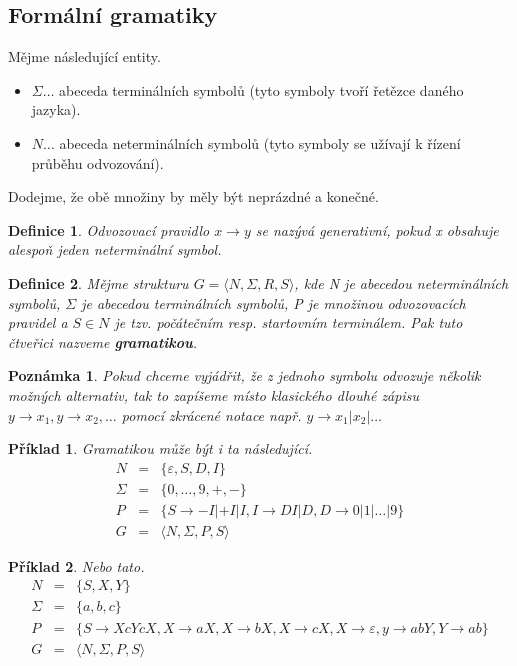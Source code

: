\documentclass[10pt, a4paper, titlepage]{article}
\theoremstyle{note}
\newtheorem{definice}{\textbf{Definice}}
\newtheorem{priklad}{\textbf{Příklad}}
\newtheorem{poznamka}{\textbf{Poznámka}}
\begin{document}
\subsection{Formální gramatiky}
Mějme následující entity.
\begin{itemize}
\item $\Sigma \ldots$ abeceda terminálních symbolů (tyto symboly tvoří řetězce daného jazyka).
\item $N \ldots$ abeceda neterminálních symbolů (tyto symboly se užívají k řízení průběhu odvozování).
\end{itemize}

Dodejme, že obě množiny by měly být neprázdné a konečné.

\begin{definice}
Odvozovací pravidlo $x \rightarrow y$ se nazývá \emph{generativní}, pokud \emph{x} obsahuje alespoň jeden neterminální symbol.
\end{definice}

\begin{definice}
Mějme strukturu $G = \langle N, \Sigma, R, S \rangle$, kde \emph{N} je abecedou neterminálních symbolů, $\Sigma$ je abecedou terminálních symbolů,
\emph{P} je množinou odvozovacích pravidel a $S \in N$ je tzv. počátečním resp. startovním terminálem. Pak tuto čtveřici nazveme \textbf{gramatikou}.
\end{definice}

\begin{poznamka}
Pokud chceme vyjádřit, že z jednoho symbolu odvozuje několik možných alternativ, tak to zapíšeme místo klasického dlouhé zápisu
$y \rightarrow x_{1}, y \rightarrow x_{2}, \ldots$ pomocí zkrácené notace např. $y \rightarrow x_{1}|x_{2}|\ldots$
\end{poznamka}

\begin{priklad}
Gramatikou může být i ta následující.
\begin{eqnarray*}
N &=& \lbrace \varepsilon, S, D, I \rbrace \\
\Sigma &=& \lbrace 0, \ldots, 9, +, - \rbrace \\
P &=& \lbrace S \rightarrow -I|+I|I, I \rightarrow DI|D, D \rightarrow 0|1|\ldots |9 \rbrace \\
G &=& \langle N, \Sigma, P, S \rangle
\end{eqnarray*}
\end{priklad}

\begin{priklad}
Nebo tato.
\begin{eqnarray*}\label{priklad-2}
N &=& \lbrace S, X, Y \rbrace \\
\Sigma &=& \lbrace a, b, c \rbrace \\
P &=& \lbrace S \rightarrow XcYcX, X \rightarrow aX, X \rightarrow bX, X \rightarrow cX, X \rightarrow \varepsilon,
y \rightarrow abY, Y \rightarrow ab \rbrace \\
G &=& \langle N, \Sigma, P, S \rangle
\end{eqnarray*}
\end{priklad}
\end{document}
